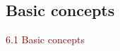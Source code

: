 \documentclass[dvipsnames,aspectratio=169]{beamer} %
\newcommand{\R}{\mathbb{R}}
\newcommand{\cX}{\mathcal{X}}
\begin{document}
\subsection{Basic concepts}

\begin{frame}{}
\begin{center}
	{\huge \textcolor{DarkRed}{6.1 Basic concepts}}
\end{center}
\end{frame}


\end{document}
